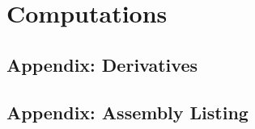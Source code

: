 \documentclass[cup9a]{cupbook}
\begin{document}

    \part{Computations}
    
    \label{part:appendix}
    \chapter{Appendix: Derivatives}
     
    \chapter{Appendix: Assembly Listing}
    
\end{document}
